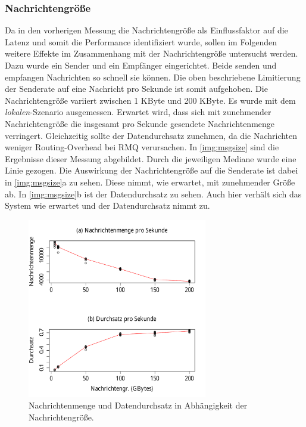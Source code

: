 \subsubsection{Nachrichtengröße}
Da in den vorherigen Messung die Nachrichtengröße als Einflussfaktor auf die Latenz und somit die Performance identifiziert wurde, sollen im Folgenden weitere Effekte im Zusammenhang mit der Nachrichtengröße untersucht werden. Dazu wurde ein Sender und ein Empfänger eingerichtet. Beide senden und empfangen Nachrichten so schnell sie können. Die oben beschriebene Limitierung der Senderate auf eine Nachricht pro Sekunde ist somit aufgehoben. Die Nachrichtengröße variiert zwischen 1 KByte und 200 KByte. Es wurde mit dem \textit{lokalen}-Szenario ausgemessen. Erwartet wird, dass sich mit zunehmender Nachrichtengröße die insgesamt pro Sekunde gesendete Nachrichtenmenge verringert. Gleichzeitig sollte der Datendurchsatz zunehmen, da die Nachrichten weniger Routing-Overhead bei RMQ verursachen.
In \autoref{img:msgsize} sind die Ergebnisse dieser Messung abgebildet. Durch die jeweiligen Mediane wurde eine Linie gezogen. Die Auswirkung der Nachrichtengröße auf die Senderate ist dabei in \autoref{img:msgsize}a zu sehen. Diese nimmt, wie erwartet, mit zunehmender Größe ab. In \autoref{img:msgsize}b ist der Datendurchsatz zu sehen. Auch hier verhält sich das System wie erwartet und der Datendurchsatz nimmt zu.
\begin{figure}
\center
  \includegraphics[width=0.7\textwidth]{images/measurement/msg-rate-vs-send-bytes.pdf}
  \caption{Nachrichtenmenge und Datendurchsatz in Abhängigkeit der Nachrichtengröße.}
  \label{img:msgsize}
\end{figure}

